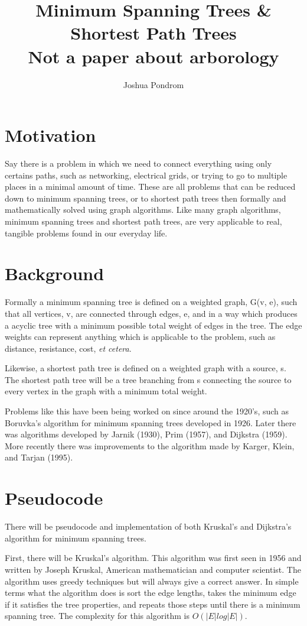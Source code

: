 \documentclass{article}
\begin{document}
\title{Minimum Spanning Trees \& Shortest Path Trees\\\large Not a paper about arborology}
\author{Joshua Pondrom}
\maketitle

\section{Motivation}
Say there is a problem in which we need to connect everything using only
certains paths, such as networking, electrical grids, or trying to go to
multiple places in a minimal amount of time. These are all problems that
can be reduced down to minimum spanning trees, or to shortest path
trees then formally and 
mathematically solved using graph algorithms. Like many graph algorithms,
minimum spanning trees and shortest path trees, are very applicable to 
real, tangible problems found in our everyday life.
\section{Background}
Formally a minimum spanning tree is defined on a weighted graph, G(v, e), such that
all vertices, v, are connected through edges, e, and in a way which
produces a acyclic tree with a minimum possible total weight of edges in
the tree. The edge weights can represent anything which is applicable to
the problem, such as distance, resistance, cost, \textit{et cetera}.

Likewise, a shortest path tree is defined on a weighted graph with a source, 
s. The shortest path tree will be a tree branching from s connecting the
source to every vertex in the graph with a minimum total weight.

Problems like this have been being worked on since around the 1920's, such as
Boruvka's algorithm for minimum spanning trees developed in 1926. Later there
was algorithms developed by Jarnik (1930), Prim (1957), and Dijkstra (1959).
More recently there was improvements to the algorithm made by Karger, Klein,
and Tarjan (1995).
\section{Pseudocode}
There will be pseudocode and implementation of both Kruskal's and Dijkstra's
algorithm for minimum spanning trees.

First, there will be Kruskal's algorithm. This algorithm was first seen in
1956 and written by Joseph Kruskal, American mathematician and computer
scientist. The algorithm uses greedy techniques but will always give a
correct answer. In simple terms what the algorithm does is sort the edge
lengths, takes the minimum edge if it satisfies the tree properties, and
repeats those steps until there is a minimum spanning tree. The complexity
for this algorithm is $O(|E|log|E|)$.
\end{document}
